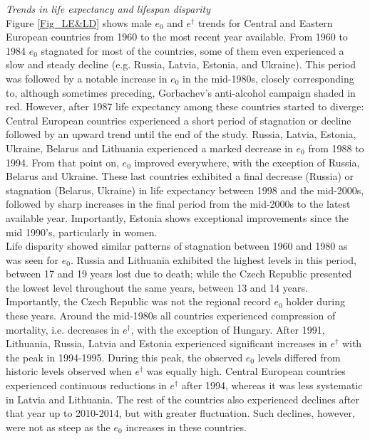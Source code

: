 \documentclass{article}
\begin{document}
\begin{spacing}{1.5}
\emph{Trends in life expectancy and lifespan disparity}\\

Figure \ref{Fig_LE&LD} shows male $e_0$ and $e^{\dagger}$ trends for Central and Eastern European countries from 1960 to the most recent year available. From 1960 to 1984 $e_0$ stagnated for most of the countries, some of them even experienced a slow and steady decline (e.g. Russia, Latvia, Estonia, and Ukraine). This period was followed by a notable increase in $e_0$ in the mid-1980s, closely corresponding to, although sometimes preceding, Gorbachev's anti-alcohol campaign shaded in red. However, after 1987 life expectancy among these countries started to diverge: Central European countries experienced a short period of stagnation or decline followed by an upward trend until the end of the study. Russia, Latvia, Estonia, Ukraine, Belarus and Lithuania experienced a marked decrease in $e_0$ from 1988 to 1994. From that point on, $e_0$ improved everywhere, with the exception of Russia, Belarus and Ukraine. These last countries exhibited a final decrease (Russia) or stagnation (Belarus, Ukraine) in life expectancy between 1998 and the mid-2000s, followed by sharp increases in the final period from the mid-2000s to the latest available year. Importantly, Estonia shows exceptional improvements since the mid 1990's, particularly in women. \\

Life disparity showed similar patterns of stagnation between 1960 and 1980 as was seen for $e_0$. Russia and Lithuania exhibited the highest levels in this period, between 17 and 19 years lost due to death; while the Czech Republic presented the lowest level throughout the same years, between 13 and 14 years. Importantly, the Czech Republic was not the regional record $e_0$ holder during these years. Around the mid-1980s all countries experienced compression of mortality, i.e. decreases in $e^{\dagger}$, with the exception of Hungary. After 1991, Lithuania, Russia, Latvia and Estonia experienced significant increases in $e^{\dagger}$ with the peak in 1994-1995. During this peak, the observed $e_0$ levels differed from historic levels observed when $e^{\dagger}$ was equally high. Central European countries experienced continuous reductions in $e^{\dagger}$ after 1994, whereas it was less systematic in Latvia and Lithuania. The rest of the countries also experienced declines after that year up to 2010-2014, but with greater fluctuation. Such declines, however, were not as steep as the $e_0$ increases in these countries.\\
 

\end{spacing}
\end{document}
